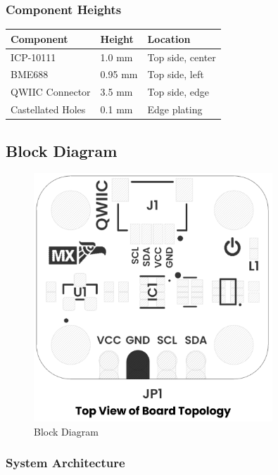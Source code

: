 \documentclass[11pt,a4paper]{article}
\begin{document}
\subsubsection{Component Heights}

\begin{table}[H]
\centering
\begin{tabular}{lll}
\toprule
Component & Height & Location \\
\midrule
ICP-10111 & 1.0 mm & Top side, center \\
BME688 & 0.95 mm & Top side, left \\
QWIIC Connector & 3.5 mm & Top side, edge \\
Castellated Holes & 0.1 mm & Edge plating \\
\bottomrule
\end{tabular}
\end{table}


\subsection{Block Diagram}

\begin{figure}[H]
\centering
\includegraphics[width=0.8\textwidth]{unit_topology_v_1_0_0_ue0094_icp10111_barometric_pressure_sensor.png}
\caption{Block Diagram}
\end{figure}

\subsubsection{System Architecture}
\end{document}
